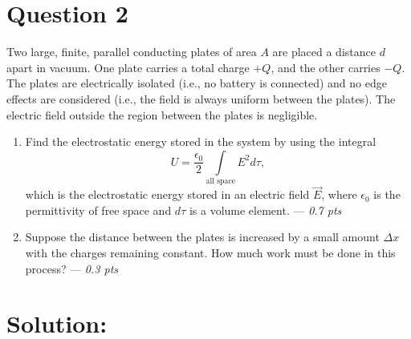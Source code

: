 \section*{Question 2}
Two large, finite, parallel conducting plates of area $A$ are placed a distance $d$ apart in vacuum. One plate carries a total charge $+Q$, and the other carries $-Q$. The plates are electrically isolated (i.e., no battery is connected) and no edge effects are considered (i.e., the field is always uniform between the plates). The electric field outside the region between the plates is negligible.

\begin{enumerate}
    \item[(a)] Find the electrostatic energy stored in the system by using the integral 
    \begin{equation*}
        U = \frac{\epsilon_0}{2} \int\limits_{\text{all space}}  E^2 d\tau,
    \end{equation*}
    which is the electrostatic energy stored in an electric field $\vec{E}$, where $\epsilon_0$ is the permittivity of free space and $d\tau$ is a volume element. --- \textit{0.7 pts}
    \item[(b)] Suppose the distance between the plates is increased by a small amount $\Delta x$ with the charges remaining constant. How much work must be done in this process? --- \textit{0.3 pts}
\end{enumerate}

\section*{Solution:}

